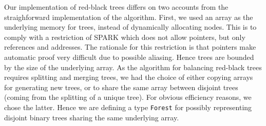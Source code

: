 \documentclass{llncs}
\newcommand{\spark}{SPARK\xspace}
\begin{document}
Our implementation of red-black trees differs on two accounts from the
straighforward implementation of the algorithm. First, we used an array as the
underlying memory for trees, instead of dynamically allocating nodes. This is
to comply with a restriction of SPARK which does not allow pointers, but only
references and addresses. The rationale for this restriction is that pointers
make automatic proof very difficult due to possible aliasing. Hence trees are
bounded by the size of the underlying array. As the algorithm for balancing
red-black trees requires splitting and merging trees, we had the choice of
either copying arrays for generating new trees, or to share the same array
between disjoint trees (coming from the splitting of a unique tree). For
obvious efficiency reasons, we chose the latter. Hence we are defining a type
\texttt{Forest} for possibly representing disjoint binary trees sharing the
same underlying array.



\end{document}
